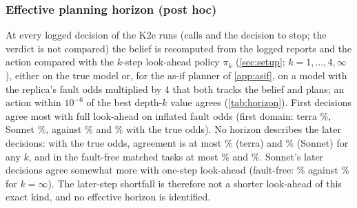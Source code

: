 \subsubsection{Effective planning horizon (post hoc)}\label{app:horizon}
At every logged decision of the K2e runs (calls and the decision to stop; the verdict is not compared) the belief is recomputed from the logged reports and the action compared with the $k$-step look-ahead policy $\pi_k$ (\cref{sec:setup}; $k=1,\dots,4,\infty$), either on the true model or, for the as-if planner of \cref{app:asif}, on a model with the replica's fault odds multiplied by 4 that both tracks the belief and plans; an action within $10^{-6}$ of the best depth-$k$ value agrees (\cref{tab:horizon}).
First decisions agree most with full look-ahead on inflated fault odds (first domain: terra \uHCoreTerraGFourFirstKInf\%, Sonnet \uHCoreSonnetGFourFirstKInf\%, against \uHCoreTerraGOneFirstKInf\% and \uHCoreSonnetGOneFirstKInf\% with the true odds).
No horizon describes the later decisions: with the true odds, agreement is at most \uHCoreTerraGOneLaterMax\% (terra) and \uHCoreSonnetGOneLaterMax\% (Sonnet) for any $k$, and in the fault-free matched tasks at most \uHMZTerraLaterMax\% and \uHMZSonnetLaterMax\%. Sonnet's later decisions agree somewhat more with one-step look-ahead (fault-free: \uHMZSonnetLaterKOne\% against \uHMZSonnetLaterKInf\% for $k=\infty$). The later-step shortfall is therefore not a shorter look-ahead of this exact kind, and no effective horizon is identified.
\begin{table}[!htbp]
\centering
\caption{Share of decisions (\%) agreeing with the $k$-step look-ahead policy $\pi_k$ on the true model ($g{=}1$) or with the replica's fault odds multiplied by $g{=}4$ (post hoc; ties agree). First: the first decision of an episode; later: all subsequent decisions up to and including the stop.}
\label{tab:horizon}
\scriptsize\setlength{\tabcolsep}{3pt}

\end{table}
